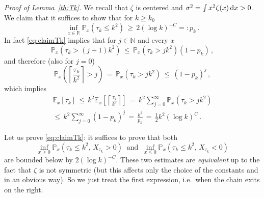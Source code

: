 \documentclass[reqno,11pt]{amsart}
\numberwithin{equation}{section}
\newcommand{\dd}{\,\text{\rm d}}             %
\newcommand{\bbE}{{\ensuremath{\mathbb E}} }
\newcommand{\bbN}{{\ensuremath{\mathbb N}} }
\newcommand{\bbP}{{\ensuremath{\mathbb P}} }
\newcommand{\bbR}{{\ensuremath{\mathbb R}} }
\newcommand{\gz}{\zeta}
\newcommand{\gs}{\sigma}
\begin{document}
\noindent
\emph{Proof of Lemma~\ref{th:Tk}.}
We recall that $\gz$ is centered and $\gs ^2=\int x^2 \gz(x) \dd x > 0$.
We claim that it suffices to show that for $k\ge k_0$
\begin{equation}
\label{eq:claimTk}
\inf_{x\in \bbR} \bbP_x\left( \tau_k \le k^2\right) \, \ge \, 2( \log k) ^{-C}=: p_k\, .
\end{equation}
In fact \eqref{eq:claimTk} implies that for $j\in \bbN$ and every $x$
\begin{equation}
\bbP_x\left( \tau_k >(j+1) k^2\right) \, \le \, \bbP_x\left( \tau_k > j k^2\right) \left(1- p_k\right)\, ,
\end{equation}
and therefore (also for $j=0$)
\begin{equation}
\bbP_x\left( \left\lceil\frac{\tau_k}{k^2} \right\rceil>j \right)\, =\, 
\bbP_x\left( \tau_k >j k^2\right) \, \le \,  \left(1- p_k\right)^j\, ,
\end{equation}
which implies 
\begin{multline}
\bbE_x \left[ \tau_k\right] \, \le \,  k^2 \bbE_x \left[ \left \lceil\frac{\tau_k}{k^2}\right \rceil\right] 
\, = \,  k^2 \sum_{j=0}^\infty \bbP_x\left( \tau_k >j k^2\right) \\ \le\,
k^2 \sum_{j=0}^\infty  \left(1- p_k\right)^j\, =\, \frac{k^2}{p_k} \, =\,  \frac 12 k^2 \left( \log k \right)^C\, .
\end{multline}

\medskip

Let us prove \eqref{eq:claimTk}:
it suffices to prove that both 
\begin{equation} 
\inf_{x\ge 0 } \bbP_x\left( \tau_k \le k^2, \, 
X_{\tau_k} >0\right)  \ \text{ and } \
 \inf_{x\le 0 } \bbP_x\left( \tau_k \le k^2, \, 
X_{\tau_k} < 0\right)
\end{equation} 
are bounded below by $2( \log k) ^{-C}$.  These two estimates are  \emph{equivalent} up to the fact 
that $\gz $ is not symmetric (but this affects only the choice of the constants and in an obvious way). So we just treat  the first expression, i.e.\ when the chain exits on the right.
\end{document}
